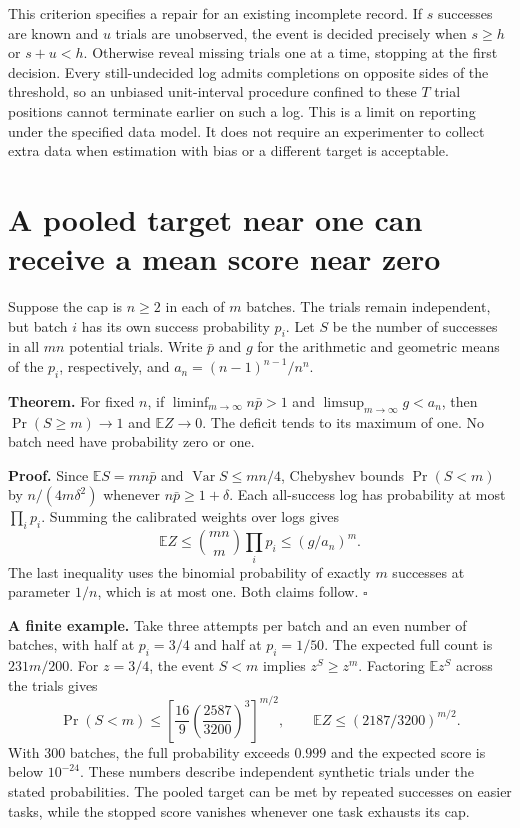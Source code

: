 \documentclass[11pt]{article}
\begin{document}
This criterion specifies a repair for an existing incomplete record. If $s$ successes are known and $u$ trials are unobserved, the event is decided precisely when $s\ge h$ or $s+u<h$. Otherwise reveal missing trials one at a time, stopping at the first decision. Every still-undecided log admits completions on opposite sides of the threshold, so an unbiased unit-interval procedure confined to these $T$ trial positions cannot terminate earlier on such a log. This is a limit on reporting under the specified data model. It does not require an experimenter to collect extra data when estimation with bias or a different target is acceptable.

\section*{A pooled target near one can receive a mean score near zero}
Suppose the cap is $n\ge2$ in each of $m$ batches. The trials remain independent, but batch $i$ has its own success probability $p_i$. Let $S$ be the number of successes in all $mn$ potential trials. Write $\bar p$ and $g$ for the arithmetic and geometric means of the $p_i$, respectively, and $a_n=(n-1)^{n-1}/n^n$.

\textbf{Theorem.} For fixed $n$, if $\liminf_{m\to\infty} n\bar p>1$ and $\limsup_{m\to\infty}g<a_n$, then $\Pr(S\ge m)\to1$ and $\mathbb E Z\to0$. The deficit tends to its maximum of one. No batch need have probability zero or one.

\textbf{Proof.} Since $\mathbb E S=mn\bar p$ and $\operatorname{Var}S\le mn/4$, Chebyshev bounds $\Pr(S<m)$ by $n/(4m\delta^2)$ whenever $n\bar p\ge1+\delta$. Each all-success log has probability at most $\prod_i p_i$. Summing the calibrated weights over logs gives
\[
\mathbb E Z\le\binom{mn}{m}\prod_i p_i\le(g/a_n)^m .
\]
The last inequality uses the binomial probability of exactly $m$ successes at parameter $1/n$, which is at most one. Both claims follow. \hfill$\square$

\textbf{A finite example.} Take three attempts per batch and an even number of batches, with half at $p_i=3/4$ and half at $p_i=1/50$. The expected full count is $231m/200$. For $z=3/4$, the event $S<m$ implies $z^S\ge z^m$. Factoring $\mathbb E z^S$ across the trials gives
\[
\Pr(S<m)\le\left[\frac{16}{9}\left(\frac{2587}{3200}\right)^3\right]^{m/2},
\qquad \mathbb E Z\le(2187/3200)^{m/2}.
\]
With 300 batches, the full probability exceeds $0.999$ and the expected score is below $10^{-24}$. These numbers describe independent synthetic trials under the stated probabilities. The pooled target can be met by repeated successes on easier tasks, while the stopped score vanishes whenever one task exhausts its cap.
\end{document}
